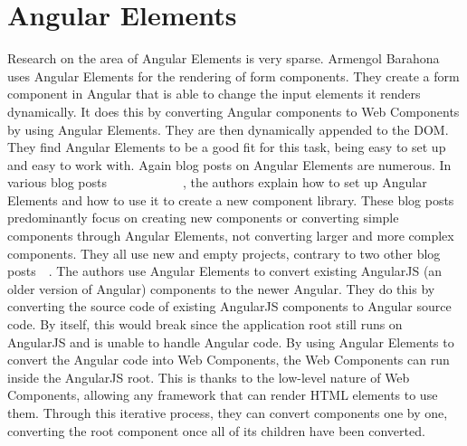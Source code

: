 \section{Angular Elements}
Research on the area of Angular Elements is very sparse. Armengol Barahona \etal{}~\cite{armengol2020development} uses Angular Elements for the rendering of form components. They create a form component in Angular that is able to change the input elements it renders dynamically. It does this by converting Angular components to Web Components by using Angular Elements. They are then dynamically appended to the DOM. They find Angular Elements to be a good fit for this task, being easy to set up and easy to work with.
Again blog posts on Angular Elements are numerous. In various blog posts~~~~~~~~~~~~, the authors explain how to set up Angular Elements and how to use it to create a new component library. These blog posts predominantly focus on creating new components or converting simple components through Angular Elements, not converting larger and more complex components. They all use new and empty projects, contrary to two other blog posts~~. The authors use Angular Elements to convert existing AngularJS (an older version of Angular) components to the newer Angular. They do this by converting the source code of existing AngularJS components to Angular source code. By itself, this would break since the application root still runs on AngularJS and is unable to handle Angular code. By using Angular Elements to convert the Angular code into Web Components, the Web Components can run inside the AngularJS root. This is thanks to the low-level nature of Web Components, allowing any framework that can render HTML elements to use them. Through this iterative process, they can convert components one by one, converting the root component once all of its children have been converted.

